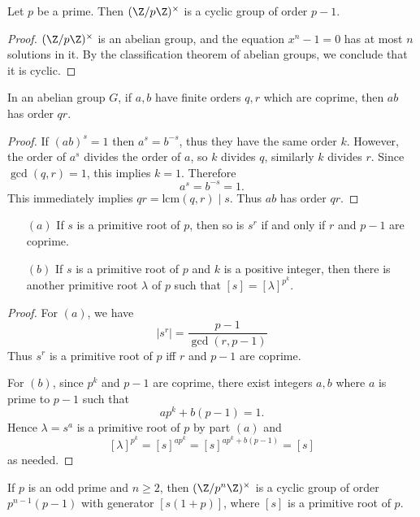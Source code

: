 \begin{proposition}
Let $p$ be a prime. Then $(\Z/p\Z)^\times$ is a cyclic group of order $p-1$.
\end{proposition}
\begin{proof}
$(\Z/p\Z)^\times$ is an abelian group, and the equation $x^{n}-1=0$ has at most $n$ solutions in it. By the classification theorem of abelian groups, we conclude that it is cyclic.
\end{proof}
\begin{lemma}
In an abelian group $G$, if $a,b$ have finite orders $q,r$ which are coprime, then $ab$ has order $qr$.
\end{lemma}
\begin{proof}
If $(ab)^s=1$ then $a^s=b^{-s}$, thus they have the same order $k$. However, the order of $a^s$ divides the order of $a$, so $k$ divides $q$, similarly $k$ divides $r$. Since $\gcd(q,r)=1$, this implies $k=1$. Therefore
\[a^s=b^{-s}=1.\]
This immediately implies $qr=\mathrm{lcm}(q,r)\mid s$. Thus $ab$ has order $qr$.
\end{proof}
\begin{lemma}\label{primitive root lem}
\mbox{}
\begin{itemize}
\item[$(a)$] If $s$ is a primitive root of $p$, then so is $s^r$ if and only if $r$ and $p-1$ are coprime.
\item[$(b)$] If $s$ is a primitive root of $p$ and $k$ is a positive integer, then there is another primitive root $\lambda$ of $p$ such that $[s]=[\lambda]^{p^k}$.
\end{itemize}
\end{lemma}
\begin{proof}
For $(a)$, we have
\[|s^r|=\frac{p-1}{\gcd(r,p-1)}\]
Thus $s^r$ is a primitive root of $p$ iff $r$ and $p-1$ are coprime.\par
For $(b)$, since $p^k$ and $p-1$ are coprime, there exist integers $a,b$ where $a$ is prime to $p-1$ such that
\[ap^k+b(p-1)=1.\]
Hence $\lambda=s^a$ is a primitive root of $p$ by part $(a)$ and
\[[\lambda]^{p^k}=[s]^{ap^k}=[s]^{ap^k+b(p-1)}=[s]\]
as needed.
\end{proof}
\begin{theorem}\label{unit Z/p^nZ}
If $p$ is an odd prime and $n\geq 2$, then $(\Z/p^n\Z)^\times$ is a cyclic group of order $p^{n-1}(p-1)$ with generator $[s(1+p)]$, where $[s]$ is a primitive root of $p$.
\end{theorem}
